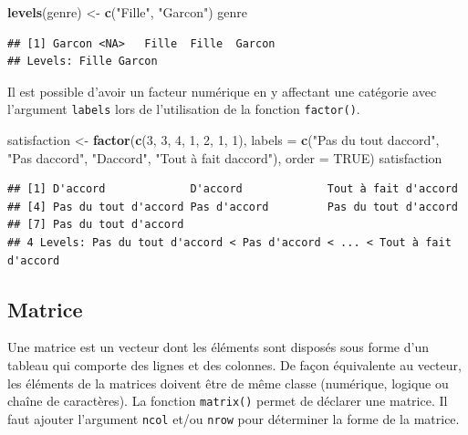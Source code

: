\documentclass[
]{book}
\newenvironment{Shaded}{\begin{snugshade}}{\end{snugshade}}
\newcommand{\AttributeTok}[1]{\textcolor[rgb]{0.13,0.29,0.53}{#1}}
\newcommand{\ConstantTok}[1]{\textcolor[rgb]{0.56,0.35,0.01}{#1}}
\newcommand{\DecValTok}[1]{\textcolor[rgb]{0.00,0.00,0.81}{#1}}
\newcommand{\FunctionTok}[1]{\textcolor[rgb]{0.13,0.29,0.53}{\textbf{#1}}}
\newcommand{\NormalTok}[1]{#1}
\newcommand{\OtherTok}[1]{\textcolor[rgb]{0.56,0.35,0.01}{#1}}
\newcommand{\StringTok}[1]{\textcolor[rgb]{0.31,0.60,0.02}{#1}}
\begin{document}
\begin{Shaded}
\begin{Highlighting}[]
\FunctionTok{levels}\NormalTok{(genre) }\OtherTok{\textless{}{-}} \FunctionTok{c}\NormalTok{(}\StringTok{"Fille"}\NormalTok{, }\StringTok{"Garcon"}\NormalTok{)}
\NormalTok{genre}
\end{Highlighting}
\end{Shaded}

\begin{verbatim}
## [1] Garcon <NA>   Fille  Fille  Garcon
## Levels: Fille Garcon
\end{verbatim}

Il est possible d'avoir un facteur numérique en y affectant une catégorie avec l'argument \texttt{labels} lors de l'utilisation de la fonction \texttt{factor()}.

\begin{Shaded}
\begin{Highlighting}[]
\NormalTok{satisfaction }\OtherTok{\textless{}{-}} \FunctionTok{factor}\NormalTok{(}\FunctionTok{c}\NormalTok{(}\DecValTok{3}\NormalTok{, }\DecValTok{3}\NormalTok{, }\DecValTok{4}\NormalTok{, }\DecValTok{1}\NormalTok{, }\DecValTok{2}\NormalTok{, }\DecValTok{1}\NormalTok{, }\DecValTok{1}\NormalTok{), }
                       \AttributeTok{labels =} \FunctionTok{c}\NormalTok{(}\StringTok{"Pas du tout d\textquotesingle{}accord"}\NormalTok{, }\StringTok{"Pas d\textquotesingle{}accord"}\NormalTok{, }
                                  \StringTok{"D\textquotesingle{}accord"}\NormalTok{, }\StringTok{"Tout à fait d\textquotesingle{}accord"}\NormalTok{), }
                       \AttributeTok{order =} \ConstantTok{TRUE}\NormalTok{)}
\NormalTok{satisfaction}
\end{Highlighting}
\end{Shaded}

\begin{verbatim}
## [1] D'accord             D'accord             Tout à fait d'accord
## [4] Pas du tout d'accord Pas d'accord         Pas du tout d'accord
## [7] Pas du tout d'accord
## 4 Levels: Pas du tout d'accord < Pas d'accord < ... < Tout à fait d'accord
\end{verbatim}

\subsection{Matrice}\label{matrice}

Une matrice est un vecteur dont les éléments sont disposés sous forme d'un tableau qui comporte des lignes et des colonnes. De façon équivalente au vecteur, les éléments de la matrices doivent être de même classe (numérique, logique ou chaîne de caractères). La fonction \texttt{matrix()} permet de déclarer une matrice. Il faut ajouter l'argument \texttt{ncol} et/ou \texttt{nrow} pour déterminer la forme de la matrice.
\end{document}
